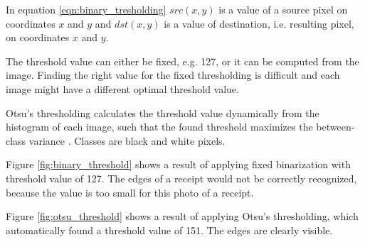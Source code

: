 \documentclass[
  digital, %
  table,   %
  oneside, %
  lof,     %
  lot,     %
]{fithesis3}
\begin{document}
In equation \ref{eqn:binary_tresholding} $src(x,y)$ is a value of a source pixel on coordinates $x$ and $y$ and $dst(x,y)$ is a value of destination, i.e. resulting pixel, on coordinates $x$ and $y$.

The threshold value can either be fixed, e.g. 127, or it can be computed from the image. Finding the right value for the fixed thresholding is difficult and each image might have a different optimal threshold value. 

Otsu's thresholding calculates the threshold value dynamically from the histogram of each image, such that the found threshold maximizes the between-class variance \cite{Gonzalez2008Digital}. Classes are black and white pixels.

Figure \ref{fig:binary_threshold} shows a result of applying fixed binarization with threshold value of 127. The edges of a receipt would not be correctly recognized, because the value is too small for this photo of a receipt. 

Figure \ref{fig:otsu_threshold} shows a result of applying Otsu's thresholding, which automatically found a threshold value of 151. The edges are clearly visible.
\end{document}

